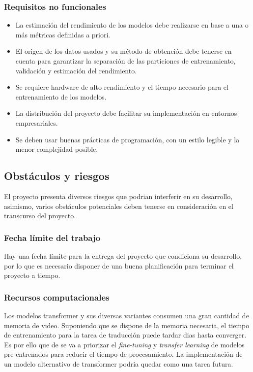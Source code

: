 \subsubsection{Requisitos no funcionales}
\begin{itemize}
    \item La estimación del rendimiento de los modelos debe realizarse en base a una o más métricas definidas
    a priori.
    \item El origen de los datos usados y su método de obtención debe tenerse en cuenta
    para garantizar la separación de las particiones de entrenamiento, validación y estimación del rendimiento.
    \item Se requiere hardware de alto rendimiento y el tiempo necesario para el entrenamiento
    de los modelos.
    \item La distribución del proyecto debe facilitar su implementación en entornos empresariales.
    \item Se deben usar buenas prácticas de programación, con un estilo legible y la menor
        complejidad posible.
\end{itemize}

\subsection{Obstáculos y riesgos}
El proyecto presenta diversos riesgos que podrian interferir en su desarrollo, asimismo, varios obstáculos
potenciales deben tenerse en consideración en el transcurso del proyecto.
\subsubsection{Fecha límite del trabajo}
Hay una fecha límite para la entrega del proyecto que condiciona su desarrollo, por lo que
es necesario disponer de una buena planificación para terminar el proyecto a tiempo.
\subsubsection{Recursos computacionales}
Los modelos transformer y sus diversas variantes consumen una gran cantidad de memoria de video.
Suponiendo que se dispone de la memoria necesaria, el tiempo de entrenamiento para la tarea de traducción
puede tardar dias hasta converger. Es por ello que de se va a priorizar el \textit{fine-tuning} y
\textit{transfer learning} de modelos pre-entrenados para reducir el tiempo de procesamiento.
La implementación de un modelo alternativo de transformer podria quedar como una tarea futura.

